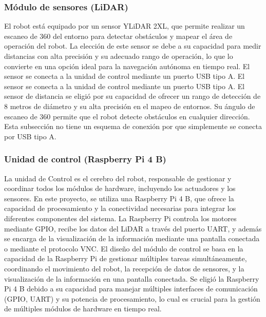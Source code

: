     \subsubsection{M\'odulo de sensores (LiDAR)} %
    \label{ssub:modsen}
    El robot est\'a equipado por un sensor YLiDAR 2XL, que permite realizar un escaneo de
        360\° del entorno para detectar obst\'aculos y mapear el \'area de operaci\'on del robot. La
        elecci\'on de este sensor se debe a su capacidad para medir distancias con alta
        precisi\'on y su adecuado rango de operaci\'on, lo que lo convierte en una opci\'on ideal
        para la navegaci\'on aut\'onoma en tiempo real.
        El sensor se conecta a la unidad de control mediante un puerto USB tipo A.
    \vskip 0.5cm
    El sensor se conecta a la unidad de control mediante un puerto USB tipo A.
    \vskip 0.5cm
    El sensor de distancia se eligi\'o por su capacidad de ofrecer un rango de detecci\'on de
        8 metros de di\'ametro y su alta precisi\'on en el mapeo de entornos. Su \'angulo de
        escaneo de 360\° permite que el robot detecte obst\'aculos en cualquier direcci\'on.
    \vskip 0.5cm
    Esta subsecci\'on no tiene un esquema de conexi\'on por que simplemente se conecta
        por USB tipo A.
    \vskip 0.5cm
    \subsubsection{Unidad de control (Raspberry Pi 4 B)} %
    \label{ssub:modcon}
    La unidad de Control es el cerebro del robot, responsable de gestionar y coordinar
        todos los m\'odulos de hardware, incluyendo los actuadores y los sensores. En este
        proyecto, se utiliza una Raspberry Pi 4 B, que ofrece la capacidad de procesamiento y
        la conectividad necesarias para integrar los diferentes componentes del sistema.
    \vskip 0.5cm
    La Raspberry Pi controla los motores mediante GPIO, recibe los datos del LiDAR a
        trav\'es del puerto UART, y adem\'as se encarga de la visualizaci\'on de la informaci\'on
        mediante una pantalla conectada o mediante el protocolo VNC.
    \vskip 0.5cm
    El dise\~no del m\'odulo de control se basa en la capacidad de la Raspberry Pi de gestionar
        m\'ultiples tareas simult\'aneamente, coordinando el movimiento del robot, la recepci\'on
        de datos de sensores, y la visualizaci\'on de la informaci\'on en una pantalla conectada.
    \vskip 0.5cm
    Se eligi\'o la Raspberry Pi 4 B debido a su capacidad para manejar m\'ultiples interfaces
        de comunicaci\'on (GPIO, UART) y su potencia de procesamiento, lo cual es crucial para
        la gesti\'on de m\'ultiples m\'odulos de hardware en tiempo real.
    \vskip 0.5cm
